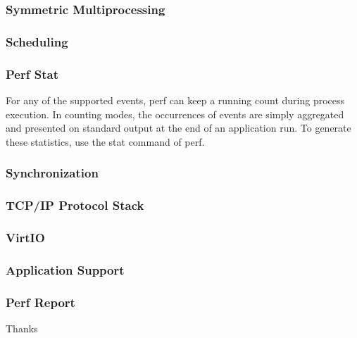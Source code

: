 \documentclass[10pt]{beamer}
\begin{document}
\begin{frame}
	\frametitle{Symmetric Multiprocessing}
  
	
\end{frame}



\begin{frame}
	\frametitle{Scheduling}


\end{frame}


\begin{frame}
	\frametitle{Perf Stat}

For any of the supported events, perf can keep a running count during process execution. In counting modes, the occurrences of events are simply aggregated and presented on standard output at the end of an application run. To generate these statistics, use the stat command of perf.

\end{frame}


\begin{frame}
	\frametitle{Synchronization}

\end{frame}


\begin{frame}
	\frametitle{TCP/IP Protocol Stack}

\end{frame}

\begin{frame}
	\frametitle{VirtIO}

\end{frame}


\begin{frame}
	\frametitle{Application Support}
	

\end{frame}



\begin{frame}
	\frametitle{Perf Report}

\center
Thanks

\end{frame}
\end{document}
